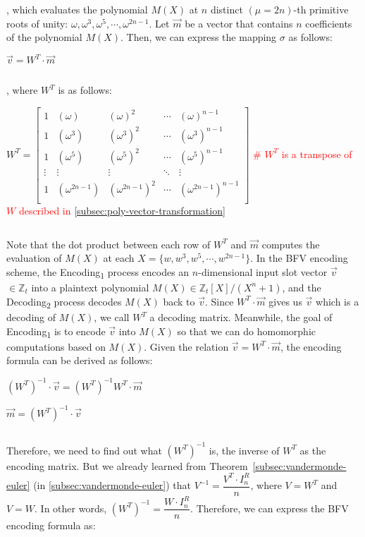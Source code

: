 $ $

, which evaluates the polynomial $M(X)$ at $n$ distinct $(\mu=2n)$-th primitive roots of unity: $\omega, \omega^3, \omega^5, \cdots, \omega^{2n-1}$. Let $\vec{m}$ be a vector that contains $n$ coefficients of the polynomial $M(X)$. Then, we can express the mapping $\sigma$ as follows: 

$\vec{v} = W^T \cdot \vec{m}$

$ $

, where $W^T$ is as follows: 

$W^T = \begin{bmatrix}
1 & (\omega) & (\omega)^2 & \cdots & (\omega)^{n-1}\\
1 & (\omega^3) & (\omega^3)^2 & \cdots & (\omega^3)^{n-1}\\
1 & (\omega^5) & (\omega^5)^2 & \cdots & (\omega^5)^{n-1}\\
\vdots & \vdots & \vdots & \ddots & \vdots \\
1 & (\omega^{2n-1}) & (\omega^{2n-1})^2 & \cdots & (\omega^{2n-1})^{n-1}\\
\end{bmatrix}$  \textcolor{red}{ \text{ } \# $W^T$ is a transpose of $W$ described in \autoref{subsec:poly-vector-transformation}}

$ $

Note that the dot product between each row of $W^T$ and $\vec{m}$ computes the evaluation of $M(X)$ at each $X = \{w, w^3, w^5, \cdots, w^{2n-1}\}$. In the BFV encoding scheme, the \textsf{Encoding\textsubscript{1}} process encodes an $n$-dimensional input slot vector $\vec{v}$ $\in \mathbb{Z}_t$ into a plaintext polynomial $M(X) \in \mathbb{Z}_t[X] / (X^n + 1)$, and the \textsf{Decoding\textsubscript{2}} process decodes $M(X)$ back to $\vec{v}$. Since $W^T \cdot \vec{m}$ gives us $\vec{v}$ which is a decoding of $M(X)$, we call $W^T$ a decoding matrix. Meanwhile, the goal of \textsf{Encoding\textsubscript{1}} is to encode $\vec{v}$ into $M(X)$ so that we can do homomorphic computations based on $M(X)$. Given the relation $\vec{v} = W^T \cdot \vec{m}$, the encoding formula can be derived as follows:

$(W^T)^{-1} \cdot \vec{v} = (W^T)^{-1} W^T \cdot \vec{m}$

$\vec{m} = (W^T)^{-1} \cdot \vec{v}$

$ $

Therefore, we need to find out what $(W^T)^{-1}$ is, the inverse of $W^T$ as the encoding matrix. But we already learned from Theorem~\ref*{subsec:vandermonde-euler} (in \autoref{subsec:vandermonde-euler}) that $V^{-1} = \dfrac{V^T \cdot I_n^R}{n}$, where $V = W^T$ and $V = W$. In other words, $(W^T)^{-1} = \dfrac{W \cdot I_n^R}{n}$. Therefore, we can express the BFV encoding formula as: 

